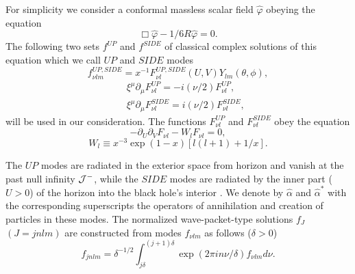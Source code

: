 \documentclass[superscriptaddress,showpacs,preprintnumbers,amsmath,amssymb,
nofootinbib,aps,prd,12pt]{revtex4-1}
\begin{document}
For simplicity we consider  a conformal massless scalar field
$\hat{\varphi}$ obeying the equation
\begin{equation}
\Box \hat{\varphi} -1/6 R\hat{\varphi}
=0. \label{9}
\end{equation}
The following two sets $f^{UP}$ and $f^{SIDE}$ of classical complex
solutions of this equation which we call  $UP$ and $SIDE$ modes
\begin{equation}
f^{UP,SIDE}_{\nu lm}=x^{-1}F^{UP,SIDE}_{\nu
l}(U,V)Y_{lm}(\theta ,\phi ), \label{10}
\end{equation}
\begin{eqnarray}
&&\xi ^{\mu}\partial _{\mu}F^{UP}_{\nu l}=-i(\nu /2) F^{UP}_{\nu l},\nonumber\\
&& \xi ^{\mu}\partial _{\mu}F^{SIDE}_{\nu l}=i(\nu /2)
F^{SIDE}_{\nu l}, \nonumber
\end{eqnarray}
will be used in our consideration. The functions
$F^{UP}_{\nu l}$ and $F^{SIDE}_{\nu l}$ obey the equation
\begin{equation}
-\partial _U \partial _V F_{\nu l} -W_l F_{\nu l} =0, \label{11}
\end{equation}
\begin{equation}
W_l \equiv x^{-3} \exp (1-x) [l(l+1)+1/x]. \label{12}
\end{equation}

The $UP$ modes are radiated  in the exterior space  from
horizon  and vanish at the past null infinity $\cal{J}^-$,
while
the $SIDE$  modes are  radiated by the inner part ($U>0$) of
the horizon  into the black hole's
interior \cite{note2}.
We  denote  by  $\hat{\alpha}$  and  $\hat{\alpha}^*$
with  the corresponding superscripts the operators of annihilation and
creation of  particles  in  these   modes.   The  normalized
wave-packet-type solutions $f_J$ $(J=jnlm)$ are constructed from modes
$f_{\nu lm}$  as follows ($\delta >0$)
\begin{equation}
f_{jnlm}=\delta ^{-1/2}\int ^{(j+1)\delta}_{j\delta}
\exp (2\pi in\nu /\delta )f_{\nu lm}d\nu .\label{13}
\end{equation}
\end{document}
